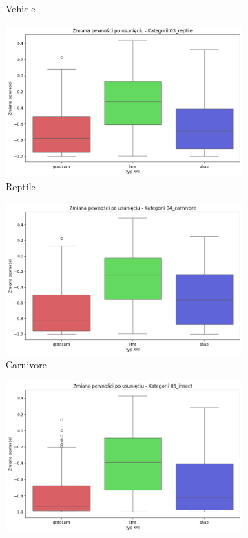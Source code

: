 \begin{figure}
\begin{subfigure}[b]{0.3\textwidth}
		\caption{Vehicle}  \label{rys:base_confidence_no_exp_vehicle}
	\end{subfigure}
	\begin{subfigure}[b]{0.3\textwidth}
		\centering\includegraphics[width=.9\textwidth]{img/base_confidence_no_exp_reptile}
		\caption{Reptile}  \label{rys:base_confidence_no_exp_reptile}
	\end{subfigure}
	\begin{subfigure}[b]{0.3\textwidth}
		\centering\includegraphics[width=.9\textwidth]{img/base_confidence_no_exp_carnivore}
		\caption{Carnivore}  \label{rys:base_confidence_no_exp_carnivore}
	\end{subfigure}
	\begin{subfigure}[b]{0.3\textwidth}
		\centering\includegraphics[width=.9\textwidth]{img/base_confidence_no_exp_insect}

\end{subfigure}
\end{figure}
